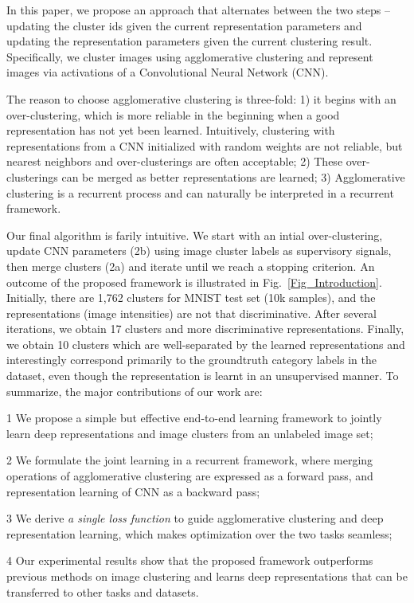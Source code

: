 \documentclass[10pt,twocolumn,letterpaper]{article}
\newenvironment{packed_enum}{
\begin{enumerate}
  \setlength{\itemsep}{1pt}
  \setlength{\parskip}{0pt}
  \setlength{\parsep}{0pt}
}{\end{enumerate}}
\begin{document}
{In this paper, we propose an approach that alternates between the two steps -- updating the cluster ids given the current representation parameters and updating the representation parameters given the current clustering result. Specifically, we cluster images using agglomerative clustering\cite{gowda1978agglomerative} and represent images via activations of a Convolutional Neural Network (CNN).}

{The reason to choose agglomerative clustering is three-fold: 1) it begins with an over-clustering, which is more reliable in the beginning when a good representation has not yet been learned. Intuitively, clustering with representations from a CNN initialized with random weights are not reliable, but nearest neighbors and over-clusterings are often acceptable; 2) These over-clusterings can be merged as better representations are learned; 3) Agglomerative clustering is a recurrent process and can naturally be interpreted in a recurrent framework.}

{Our final algorithm is farily intuitive. We start with an intial over-clustering, update CNN parameters (2b) using image cluster labels as supervisory signals, then merge clusters (2a) and iterate until we reach a stopping criterion.} An outcome of the proposed framework is illustrated in Fig.~\ref{Fig_Introduction}. Initially, there are 1,762 clusters for MNIST test set (10k samples), and the representations (image intensities) are not that discriminative. After several iterations, we obtain 17 clusters and more discriminative representations. Finally, we obtain 10 clusters which are well-separated by the learned representations and {interestingly correspond primarily to the groundtruth category labels in the dataset, even though the representation is learnt in an unsupervised manner}. To summarize, the major contributions of our work are:
\begin{packed_enum}
\item[1] We propose a {simple but effective} end-to-end learning framework to {jointly learn deep representations and image clusters} {from an} unlabeled image set;
\item[2] We formulate the joint learning in a {recurrent framework}, where {merging} operations of {agglomerative} clustering are expressed as a forward pass, {and} representation learning of CNN as a backward pass;
\item[3] We derive \emph{a single loss function} to guide agglomerative clustering and deep representation learning, {which makes optimization {over the} two tasks seamless};
\item[4] Our experimental results show that the proposed framework outperforms previous methods on image clustering and learns deep representations that can be transferred to other tasks and datasets.
\end{packed_enum}
\end{document}
